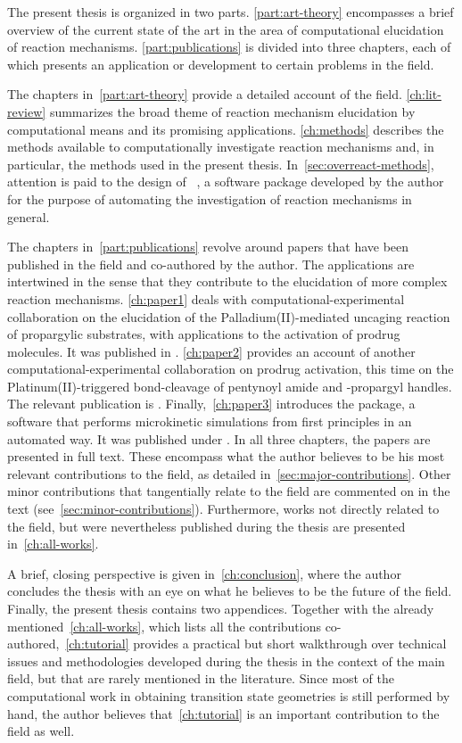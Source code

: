 The present thesis is organized in two parts.
\cref{part:art-theory}
encompasses a brief overview of the current state of the art in the area of
computational elucidation of reaction mechanisms.
\cref{part:publications} is divided into three chapters,
each of which
presents an application or development to certain problems in the field.

The chapters in~\cref{part:art-theory} provide a detailed account of the
field.
\cref{ch:lit-review} summarizes the broad theme of reaction mechanism
elucidation by computational means and its promising applications.
\cref{ch:methods} describes the methods available to computationally
investigate reaction mechanisms and,
in particular,
the methods used in the
present thesis.
In~\cref{sec:overreact-methods},
attention is paid to the design
of \overreact~\cite{Schneider_2022,overreact2021zenodo},
a software package developed by the
author for the purpose of automating the investigation of reaction mechanisms
in general.

The chapters in~\cref{part:publications} revolve around papers that have
been published in the field and co-authored by the author.
The applications are intertwined in the sense
that they contribute to the elucidation of more complex reaction mechanisms.
\cref{ch:paper1} deals with
computational-experimental collaboration on the elucidation
of the Palladium(II)-mediated uncaging reaction of propargylic substrates,
with applications to the activation of prodrug molecules.\@
It was published in
\emph{}.
\cref{ch:paper2} provides an account of
another computational-experimental collaboration on prodrug activation,
this time on the Platinum(II)-triggered bond-cleavage
of pentynoyl amide and -propargyl handles.\@
The relevant publication is
\emph{}.
Finally,~\cref{ch:paper3} introduces the
\overreact{} package,
a software that performs microkinetic simulations
from first principles in an automated way.\@
It was published under
\emph{}.
In all three chapters,
the papers are presented in full text.
These encompass what the author believes to be his most relevant
contributions to the field,
as detailed in~\cref{sec:major-contributions}.
Other minor contributions that tangentially relate to the field are commented
on in the text (see~\cref{sec:minor-contributions}).
Furthermore,
works not directly related to the
field,
but were nevertheless published during the thesis are
presented in~\cref{ch:all-works}.

A brief,
closing perspective is given in~\cref{ch:conclusion},
where
the author concludes the thesis with an eye on what he believes to be the
future of the field.
Finally,
the present thesis contains two appendices.
Together with the already mentioned~\cref{ch:all-works},
which lists all
the contributions co-authored,~\cref{ch:tutorial} provides a practical but
short walkthrough over technical issues and methodologies developed during the
thesis in the context of the main field,
but that are rarely mentioned in the
literature.
Since most of the computational work in obtaining transition state geometries
is still performed by hand,
the author believes that~\cref{ch:tutorial} is an important contribution to the field as well.
